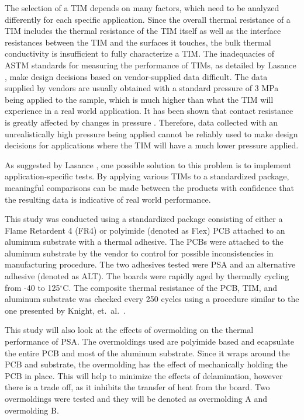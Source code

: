 The selection of a TIM depends on many factors, which need to be analyzed differently for each specific application.  Since the overall thermal resistance of a TIM includes the thermal resistance of the TIM itself as well as the interface resistances between the TIM and the surfaces it touches, the bulk thermal conductivity is insufficient to fully characterize a TIM.  The inadequacies of ASTM standards for measuring the performance of TIMs, as detailed by Lasance \cite{Lasance2003}, make design decisions based on vendor-supplied data difficult.  The data supplied by vendors are usually obtained with a standard pressure of 3 MPa being applied to the sample, which is much higher than what the TIM will experience in a real world application.  It has been shown that contact resistance is greatly affected by changes in pressure \cite{Nakayama2003}.  Therefore, data collected with an unrealistically high pressure being applied cannot be reliably used to make design decisions for applications where the TIM will have a much lower pressure applied.  

As suggested by Lasance \cite{Lasance2003}, one possible solution to this problem is to implement application-specific tests.  By applying various TIMs to a standardized package, meaningful comparisons can be made between the products with confidence that the resulting data is indicative of real world performance.  

This study was conducted using a standardized package consisting of either a Flame Retardent 4 (FR4) or polyimide (denoted as Flex) PCB attached to an aluminum substrate with a thermal adhesive.  The PCBs were attached to the aluminum substrate by the vendor to control for possible inconsistencies in manufacturing procedure.  The two adhesives tested were PSA and an alternative adhesive (denoted as ALT).  The boards were rapidly aged by thermally cycling from -40 to 125$^{\circ}\mathrm{C}$.  The composite thermal resistance of the PCB, TIM, and aluminum substrate was checked every 250 cycles using a procedure similar to the one presented by Knight, et.~al.~\cite{Knight2007}.  

This study will also look at the effects of overmolding on the thermal performance of PSA.  The overmoldings used are polyimide based and ecapsulate the entire PCB and most of the aluminum substrate. Since it wraps around the PCB and substrate, the overmolding has the effect of mechanically holding the PCB in place.  This will help to minimize the effects of delamination, however there is a trade off, as it inhibits the transfer of heat from the board.  Two overmoldings were tested and they will be denoted as overmolding A and overmolding B.

